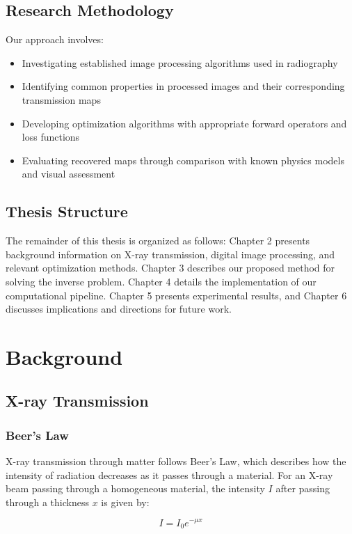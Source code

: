 \documentclass[nomenclature, english, bibtex]{kththesis}
\numberwithin{listing}{chapter}
\begin{document}
\section{Research Methodology}
Our approach involves:
\begin{itemize}
    \item Investigating established image processing algorithms used in radiography
    \item Identifying common properties in processed images and their corresponding transmission maps
    \item Developing optimization algorithms with appropriate forward operators and loss functions
    \item Evaluating recovered maps through comparison with known physics models and visual assessment
\end{itemize}

\section{Thesis Structure}
The remainder of this thesis is organized as follows: Chapter 2 presents background information on X-ray transmission, digital image processing, and relevant optimization methods. Chapter 3 describes our proposed method for solving the inverse problem. Chapter 4 details the implementation of our computational pipeline. Chapter 5 presents experimental results, and Chapter 6 discusses implications and directions for future work.

\chapter{Background}

\section{X-ray Transmission}
\subsection{Beer's Law}
X-ray transmission through matter follows Beer's Law, which describes how the intensity of radiation decreases as it passes through a material. For an X-ray beam passing through a homogeneous material, the intensity $I$ after passing through a thickness $x$ is given by:

\begin{equation}
I = I_0 e^{-\mu x}
\end{equation}
\end{document}
